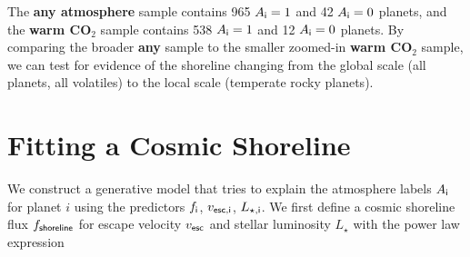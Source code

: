 \documentclass[modern,linenumbers,trackchanges]{aastex7}
\begin{document}
The {\bf any atmosphere} sample contains 965 $A_{\sf i} = 1$ and 42 $A_{\sf i} = 0$ planets, and the {\bf warm CO$_2$} sample contains 538 $A_{\sf i} = 1$ and 12 $A_{\sf i} = 0$ planets. By comparing the broader {\bf any} sample to the smaller zoomed-in {\bf warm CO$_2$} sample, we can test for evidence of the shoreline changing from the global scale (all planets, all volatiles) to the local scale (temperate rocky planets). 

\section{Fitting a Cosmic Shoreline}
\label{s:fitting} 

We construct a generative model that tries to explain the atmosphere labels $A_{\sf i}$ for planet $i$ using the predictors $f_{\sf i}$, $v_{\sf esc, i}$, $L_{\sf \star, i}$. We first define a cosmic shoreline flux $f_{\sf shoreline}$ for escape velocity $v_{\sf esc}$ and stellar luminosity $L_\star$ with the power law expression
\end{document}
